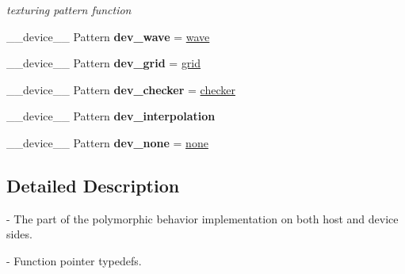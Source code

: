 \begin{DoxyCompactItemize}
\begin{DoxyCompactList}\small\item\em texturing pattern function \end{DoxyCompactList}\item 
\+\_\+\+\_\+device\+\_\+\+\_\+ Pattern {\bfseries dev\+\_\+wave} = \hyperlink{group__intersection__test__prperties_gaff97add1678535636b1f4f1ca3f7a96c}{wave}\hypertarget{group__device__pointers_ga106fc9eb2215ecfb1360a3334a8f22dd}{}\label{group__device__pointers_ga106fc9eb2215ecfb1360a3334a8f22dd}

\item 
\+\_\+\+\_\+device\+\_\+\+\_\+ Pattern {\bfseries dev\+\_\+grid} = \hyperlink{group__intersection__test__prperties_ga4db329f1c6b211cd0ac9e6dc297f279e}{grid}\hypertarget{group__device__pointers_gaf458f0bb79e06d9beaee341c3955cb1c}{}\label{group__device__pointers_gaf458f0bb79e06d9beaee341c3955cb1c}

\item 
\+\_\+\+\_\+device\+\_\+\+\_\+ Pattern {\bfseries dev\+\_\+checker} = \hyperlink{group__intersection__test__prperties_ga100df37360dfe6954f51431bc6343dc6}{checker}\hypertarget{group__device__pointers_ga0a22f4af565cbe3e8e8eb8719d3ac30f}{}\label{group__device__pointers_ga0a22f4af565cbe3e8e8eb8719d3ac30f}

\item 
\+\_\+\+\_\+device\+\_\+\+\_\+ Pattern {\bfseries dev\+\_\+interpolation}\hypertarget{group__device__pointers_ga050793208c04dff921d09f103558fded}{}\label{group__device__pointers_ga050793208c04dff921d09f103558fded}

\item 
\+\_\+\+\_\+device\+\_\+\+\_\+ Pattern {\bfseries dev\+\_\+none} = \hyperlink{group__intersection__test__prperties_ga6ea9f9e6624268a263962a17c6634feb}{none}\hypertarget{group__device__pointers_ga5e312ec8917b7248b60bffc6f165618b}{}\label{group__device__pointers_ga5e312ec8917b7248b60bffc6f165618b}

\end{DoxyCompactItemize}


\subsection{Detailed Description}
-\/ The part of the polymorphic behavior implementation on both host and device sides.

-\/ Function pointer typedefs. 